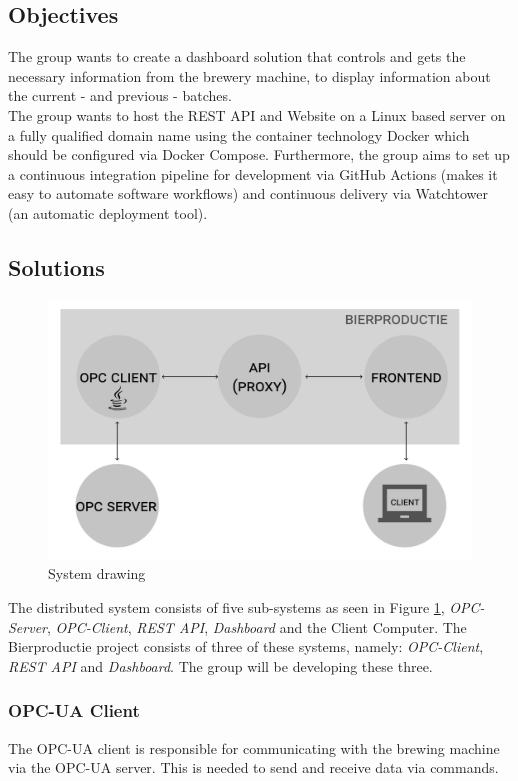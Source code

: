 \subsection{Objectives}
The group wants to create a dashboard solution that controls and gets the
necessary information from the brewery machine, to display information about the
current - and previous - batches.\\

The group wants to host the REST API and Website on a Linux based server on a
fully qualified domain name using the container technology Docker which should
be configured via Docker Compose. Furthermore, the group aims to set up a
continuous integration pipeline for development via GitHub Actions (makes it
easy to automate software workflows) and continuous delivery via Watchtower (an
automatic deployment tool).

\subsection{Solutions}
\begin{figure}[h]
\centering 
\includegraphics[scale=0.3]{../project_proposal/images/system_drawing.pdf}
\caption{System drawing} 
\label{figure:system_drawing}
\end{figure}

The distributed system consists of five sub-systems as seen in Figure
\ref{figure:system_drawing}, \textit{OPC-Server}, \textit{OPC-Client},
\textit{REST API}, \textit{Dashboard} and the Client Computer. The Bierproductie
project consists of three of these systems, namely: \textit{OPC-Client},
\textit{REST API} and \textit{Dashboard}. The group will be developing these
three.

\subsubsection{OPC-UA Client}
The OPC-UA client is responsible for communicating with the brewing machine via
the OPC-UA server. This is needed to send and receive data via
commands.

